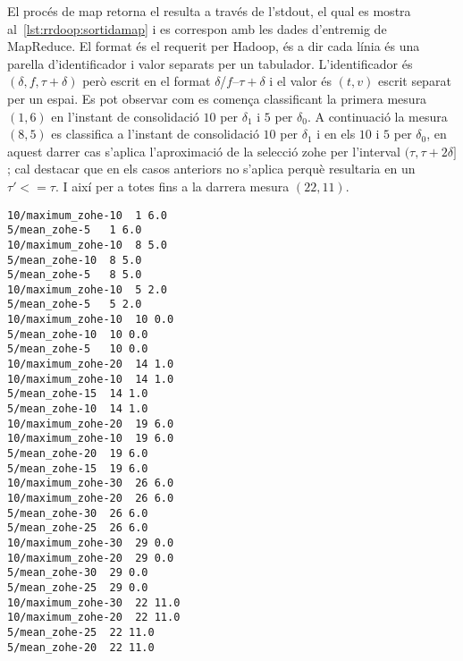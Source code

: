 El procés de map retorna el resulta a través de l'stdout, el qual es
mostra al~\autoref{lst:rrdoop:sortidamap} i es correspon amb les dades
d'entremig de MapReduce. El format és el requerit per Hadoop, és a dir
cada línia és una parella d'identificador i valor separats per un
tabulador. L'identificador és $(\delta,f,\tau+\delta)$ però escrit en el
format $\delta$/$f$--$\tau+\delta$ i el valor és $(t,v)$ escrit separat per
un espai. Es pot observar com es comença classificant la primera
mesura $(1,6)$ en l'instant de consolidació $10$ per $\delta_1$ i
$5$ per $\delta_0$.  A continuació la mesura $(8,5)$ es classifica
a l'instant de consolidació $10$ per $\delta_1$ i en els $10$
i $5$ per $\delta_0$, en aquest darrer cas s'aplica l'aproximació
de la selecció \gls{zohe} per l'interval $(\tau,\tau+2\delta]$;
cal destacar que en els casos anteriors no s'aplica perquè resultaria en
un $\tau'<= \tau$.  I així per a totes fins a la darrera mesura
$(22,11)$.
\begin{lstlisting}[style=stdout,caption=Sortida del procés map,label=lst:rrdoop:sortidamap]
10/maximum_zohe-10	1 6.0
5/mean_zohe-5	1 6.0
10/maximum_zohe-10	8 5.0
5/mean_zohe-10	8 5.0
5/mean_zohe-5	8 5.0
10/maximum_zohe-10	5 2.0
5/mean_zohe-5	5 2.0
10/maximum_zohe-10	10 0.0
5/mean_zohe-10	10 0.0
5/mean_zohe-5	10 0.0
10/maximum_zohe-20	14 1.0
10/maximum_zohe-10	14 1.0
5/mean_zohe-15	14 1.0
5/mean_zohe-10	14 1.0
10/maximum_zohe-20	19 6.0
10/maximum_zohe-10	19 6.0
5/mean_zohe-20	19 6.0
5/mean_zohe-15	19 6.0
10/maximum_zohe-30	26 6.0
10/maximum_zohe-20	26 6.0
5/mean_zohe-30	26 6.0
5/mean_zohe-25	26 6.0
10/maximum_zohe-30	29 0.0
10/maximum_zohe-20	29 0.0
5/mean_zohe-30	29 0.0
5/mean_zohe-25	29 0.0
10/maximum_zohe-30	22 11.0
10/maximum_zohe-20	22 11.0
5/mean_zohe-25	22 11.0
5/mean_zohe-20	22 11.0
\end{lstlisting}


